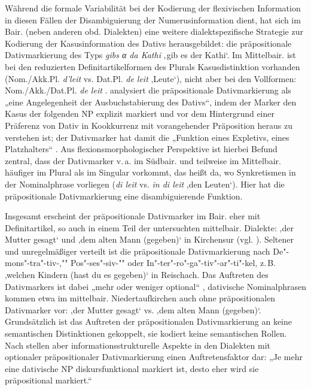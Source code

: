 Während die formale Variabilität bei der Kodierung der flexivischen Information in diesen Fällen der Disambiguierung der Numerusinformation dient, hat sich im Bair. (neben anderen obd. Dialekten) eine weitere dialektspezifische Strategie zur Kodierung der Kasusinformation des Dativs herausgebildet: die präpositionale Dativmarkierung des Typs \textit{gibs α da Kathi} ‚gib es der Kathi‘. Im Mittelbair. ist bei den reduzierten Definitartikelformen des Plurals Kasusdistinktion vorhanden (Nom./Akk.Pl. \textit{d’leit} vs. Dat.Pl. \textit{de leit} ‚Leute‘), nicht aber bei den Vollformen: Nom./Akk./Dat.Pl. \textit{de leit} \citep[98--99]{Seiler2003}. \citet[150]{Seiler2003} analysiert die präpositionale Dativmarkierung als „eine Angelegenheit der Ausbuchstabierung des Dativs“, indem der Marker den Kasus der folgenden NP explizit markiert und vor dem Hintergrund einer Präferenz von Dativ in Kookkurrenz mit vorangehender Präposition heraus zu verstehen ist; der Dativmarker hat damit die „Funktion eines Expletivs, eines Platzhalters“ \citep[148]{Seiler2003}. Aus flexionsmorphologischer Perspektive ist hierbei  Befund zentral, dass der Dativmarker v.\,a. im Südbair. und teilweise im Mittelbair. häufiger im Plural als im Singular vorkommt, das heißt da, wo Synkretismen in der Nominalphrase vorliegen (\textit{di leit} vs. \textit{in di leit} ‚den Leuten‘). Hier hat die präpositionale Dativmarkierung eine disambiguierende Funktion.

Insgesamt erscheint der präpositionale Dativmarker im Bair. eher mit Definitartikel, so auch in einem Teil der untersuchten mittelbair. Dialekte:     ‚der Mutter gesagt‘ und     ‚dem alten Mann (gegeben)‘ in Kirchensur (vgl. \citealt[106--110]{Seiler2003}). Seltener und unregelmäßiger verteilt ist die präpositionale Dativmarkierung nach De"-mons"-tra"-tiv-,"" Pos"-ses"-siv-"" oder In"-ter"-ro"-ga"-tiv"-ar"-ti"-kel, z.\,B.     ‚welchen Kindern (hast du es gegeben)‘ in Reischach. Das Auftreten des Dativmarkers ist dabei „mehr oder weniger optional“ \citep[152]{Seiler2003}, {{dativische}} Nominalphrasen kommen etwa im mittelbair. Niedertaufkirchen auch ohne präpositionalen Dativmarker vor:     ‚der Mutter gesagt‘ vs.    ‚dem alten Mann (gegeben)‘. Grundsätzlich ist das Auftreten der präpositionalen Dativmarkierung an keine semantischen Distinktionen gekoppelt, sie kodiert keine semantischen Rollen. Nach \citet[187]{Seiler2003} stellen aber informationsstrukturelle Aspekte in den Dialekten mit optionaler präpositionaler Dativmarkierung einen Auftretensfaktor dar: „Je mehr eine dativische NP diskursfunktional markiert ist, desto eher wird sie präpositional markiert.“

